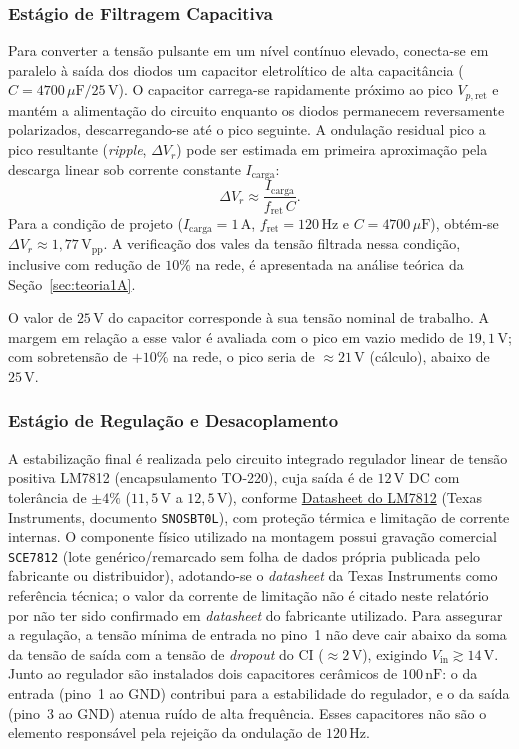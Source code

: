 \subsubsection{Estágio de Filtragem Capacitiva}
Para converter a tensão pulsante em um nível contínuo elevado, conecta-se em paralelo à saída dos diodos um capacitor eletrolítico de alta capacitância ($C = 4700\,\mu\text{F} / 25\,\text{V}$). O capacitor carrega-se rapidamente próximo ao pico $V_{p,\text{ret}}$ e mantém a alimentação do circuito enquanto os diodos permanecem reversamente polarizados, descarregando-se até o pico seguinte. A ondulação residual pico a pico resultante (\textit{ripple}, $\Delta V_r$) pode ser estimada em primeira aproximação pela descarga linear sob corrente constante $I_{\text{carga}}$:
\begin{equation}
\Delta V_r \approx \frac{I_{\text{carga}}}{f_{\text{ret}}\, C}.
\label{eq:ripple}
\end{equation}
Para a condição de projeto ($I_{\text{carga}} = 1\,\text{A}$, $f_{\text{ret}} = 120\,\text{Hz}$ e $C = 4700\,\mu\text{F}$), obtém-se $\Delta V_r \approx 1{,}77\,\text{V}_{\text{pp}}$. A verificação dos vales da tensão filtrada nessa condição, inclusive com redução de $10\%$ na rede, é apresentada na análise teórica da Seção~\ref{sec:teoria1A}.

O valor de $25\,\text{V}$ do capacitor corresponde à sua tensão nominal de trabalho. A margem em relação a esse valor é avaliada com o pico em vazio medido de $19{,}1\,\text{V}$; com sobretensão de $+10\%$ na rede, o pico seria de $\approx 21\,\text{V}$ (cálculo), abaixo de $25\,\text{V}$.

\subsubsection{Estágio de Regulação e Desacoplamento}
A estabilização final é realizada pelo circuito integrado regulador linear de tensão positiva LM7812 (encapsulamento TO-220), cuja saída é de $12\,\text{V}$ DC com tolerância de $\pm 4\%$ ($11{,}5\,\text{V}$ a $12{,}5\,\text{V}$), conforme \href{https://www.ti.com/lit/ds/symlink/lm340.pdf}{Datasheet do LM7812} (Texas Instruments, documento \texttt{SNOSBT0L}), com proteção térmica e limitação de corrente internas. O componente físico utilizado na montagem possui gravação comercial \texttt{SCE7812} (lote genérico/remarcado sem folha de dados própria publicada pelo fabricante ou distribuidor), adotando-se o \textit{datasheet} da Texas Instruments como referência técnica; o valor da corrente de limitação não é citado neste relatório por não ter sido confirmado em \textit{datasheet} do fabricante utilizado. Para assegurar a regulação, a tensão mínima de entrada no pino~1 não deve cair abaixo da soma da tensão de saída com a tensão de \textit{dropout} do CI ($\approx 2\,\text{V}$), exigindo $V_{\text{in}} \gtrsim 14\,\text{V}$. Junto ao regulador são instalados dois capacitores cerâmicos de $100\,\text{nF}$: o da entrada (pino~1 ao GND) contribui para a estabilidade do regulador, e o da saída (pino~3 ao GND) atenua ruído de alta frequência. Esses capacitores não são o elemento responsável pela rejeição da ondulação de $120\,\text{Hz}$.

